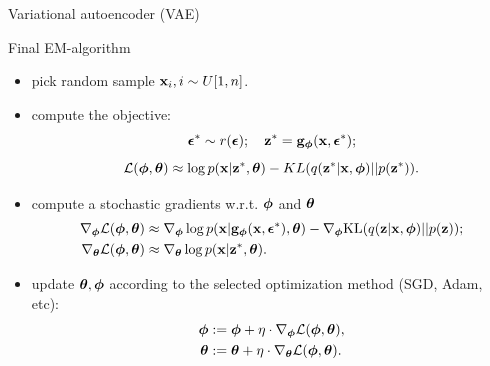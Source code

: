 \begin{frame}{Variational autoencoder (VAE)}
	\begin{block}{Final EM-algorithm}
		\begin{itemize}
			\item pick random sample $\mathbf{x}_i, i \sim U[1, n]$.
			\item compute the objective:
			\vspace{-0.3cm}
			\[
				\boldsymbol{\epsilon}^* \sim r(\boldsymbol{\epsilon}); \quad \mathbf{z}^* = \mathbf{g}_{\boldsymbol{\phi}}(\mathbf{x}, \boldsymbol{\epsilon}^*);
			\]
			\[
				\mathcal{L}(\boldsymbol{\phi}, \boldsymbol{\theta}) \approx  \log p(\mathbf{x} | \mathbf{z}^*, \boldsymbol{\theta}) - KL(q(\mathbf{z}^* | \mathbf{x}, \boldsymbol{\phi}) || p(\mathbf{z}^*)).
			\]
			\item compute a stochastic gradients w.r.t. $\boldsymbol{\phi}$ and $\boldsymbol{\theta}$
			\begin{align*}
				\nabla_{\boldsymbol{\phi}} \mathcal{L} (\boldsymbol{\phi}, \boldsymbol{\theta}) &\approx \nabla_{\boldsymbol{\phi}} \log p(\mathbf{x} | \mathbf{g}_{\boldsymbol{\phi}}(\mathbf{x}, \boldsymbol{\epsilon}^*), \boldsymbol{\theta})  - \nabla_{\boldsymbol{\phi}} \text{KL}(q(\mathbf{z} | \mathbf{x}, \boldsymbol{\phi}) || p(\mathbf{z})); \\
				\nabla_{\boldsymbol{\theta}} \mathcal{L} (\boldsymbol{\phi}, \boldsymbol{\theta}) &\approx \nabla_{\boldsymbol{\theta}} \log p(\mathbf{x}|\mathbf{z}^*, \boldsymbol{\theta}).
			\end{align*}
			\item update $\boldsymbol{\theta}, \boldsymbol{\phi}$ according to the selected optimization method (SGD, Adam, etc):
			\begin{align*}
				\boldsymbol{\phi} &:= \boldsymbol{\phi} + \eta \cdot \nabla_{\boldsymbol{\phi}} \mathcal{L}(\boldsymbol{\phi}, \boldsymbol{\theta}), \\
				\boldsymbol{\theta} &:= \boldsymbol{\theta} + \eta \cdot \nabla_{\boldsymbol{\theta}} \mathcal{L}(\boldsymbol{\phi}, \boldsymbol{\theta}).
			\end{align*}
		\end{itemize}
	\end{block}
\end{frame}
